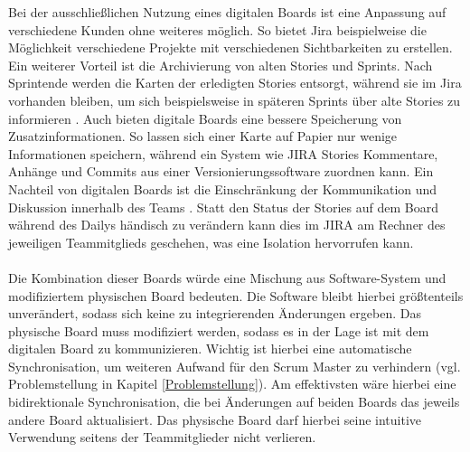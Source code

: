 \documentclass[12pt,titlepage]{scrartcl}
\begin{document}
		Bei der ausschließlichen Nutzung eines digitalen Boards ist eine Anpassung auf verschiedene Kunden ohne weiteres möglich. So bietet Jira beispielweise die Möglichkeit verschiedene Projekte mit verschiedenen Sichtbarkeiten zu erstellen. Ein weiterer Vorteil ist die Archivierung von alten Stories und Sprints. Nach Sprintende werden die Karten der erledigten Stories entsorgt, während sie im Jira vorhanden bleiben, um sich beispielsweise in späteren Sprints über alte Stories zu informieren \cite{softtools}. Auch bieten digitale Boards eine bessere Speicherung von Zusatzinformationen. So lassen sich einer Karte auf Papier nur wenige Informationen speichern, während ein System wie JIRA Stories Kommentare, Anhänge und Commits aus einer Versionierungssoftware zuordnen kann. Ein Nachteil von digitalen Boards ist die Einschränkung der Kommunikation und Diskussion innerhalb des Teams \cite{drift}. Statt den Status der Stories auf dem Board während des Dailys händisch zu verändern kann dies im JIRA am Rechner des jeweiligen Teammitglieds geschehen, was eine Isolation hervorrufen kann. \\ \\
		Die Kombination dieser Boards würde eine Mischung aus Software-System und modifiziertem physischen Board bedeuten. Die Software bleibt hierbei größtenteils unverändert, sodass sich keine zu integrierenden Änderungen ergeben. Das physische Board muss modifiziert werden, sodass es in der Lage ist mit dem digitalen Board zu kommunizieren. Wichtig ist hierbei eine automatische Synchronisation, um weiteren Aufwand für den Scrum Master zu verhindern (vgl. Problemstellung in Kapitel \ref{Problemstellung}). Am effektivsten wäre hierbei eine bidirektionale Synchronisation, die bei Änderungen auf beiden Boards das jeweils andere Board aktualisiert. Das physische Board darf hierbei seine intuitive Verwendung seitens der Teammitglieder nicht verlieren.
\end{document}
